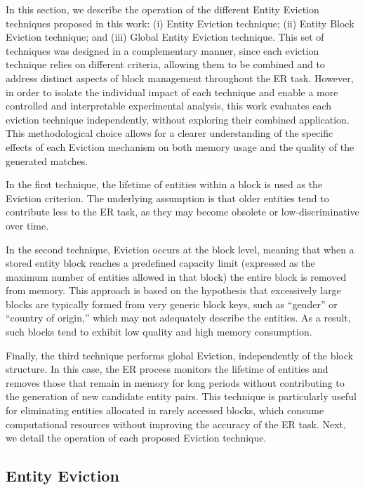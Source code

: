 \documentclass{ieeeaccess}
\begin{document}
In this section, we describe the operation of the different Entity Eviction techniques proposed in this work: (i) Entity Eviction technique; (ii) Entity Block Eviction technique; and (iii) Global Entity Eviction technique. This set of techniques was designed in a complementary manner, since each eviction technique relies on different criteria, allowing them to be combined and to address distinct aspects of block management throughout the ER task. However, in order to isolate the individual impact of each technique and enable a more controlled and interpretable experimental analysis, this work evaluates each eviction technique independently, without exploring their combined application. This methodological choice allows for a clearer understanding of the specific effects of each Eviction mechanism on both memory usage and the quality of the generated matches.

In the first technique, the lifetime of entities within a block is used as the Eviction criterion. The underlying assumption is that older entities tend to contribute less to the ER task, as they may become obsolete or low-discriminative over time.

In the second technique, Eviction occurs at the block level, meaning that when a stored entity block reaches a predefined capacity limit (expressed as the maximum number of entities allowed in that block) the entire block is removed from memory. This approach is based on the hypothesis that excessively large blocks are typically formed from very generic block keys, such as “gender” or “country of origin,” which may not adequately describe the entities. As a result, such blocks tend to exhibit low quality and high memory consumption.

Finally, the third technique performs global Eviction, independently of the block structure. In this case, the ER process monitors the lifetime of entities and removes those that remain in memory for long periods without contributing to the generation of new candidate entity pairs. This technique is particularly useful for eliminating entities allocated in rarely accessed blocks, which consume computational resources without improving the accuracy of the ER task. Next, we detail the operation of each proposed Eviction technique.

\subsection{Entity Eviction} \label{subsec:descarte-entidades}
\end{document}
